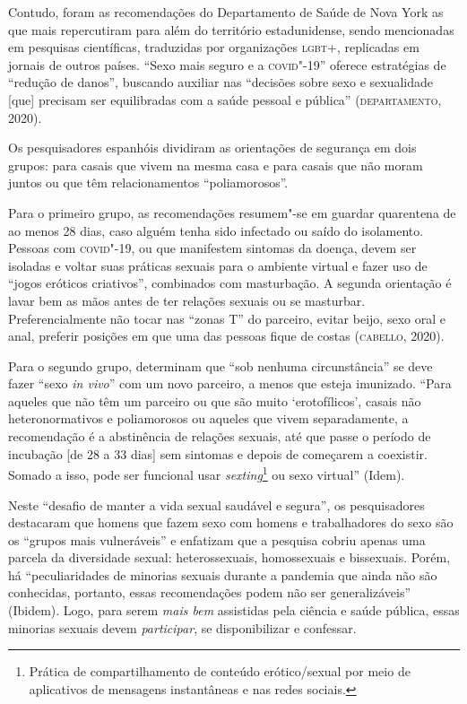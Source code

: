 Contudo, foram as recomendações do Departamento de Saúde de Nova York as
que mais repercutiram para além do território estadunidense, sendo
mencionadas em pesquisas científicas, traduzidas por organizações \textsc{lgbt}+,
replicadas em jornais de outros países. ``Sexo mais seguro e a
\textsc{covid}"-19'' oferece estratégias de ``redução de danos'', buscando
auxiliar nas ``decisões sobre sexo e sexualidade {[}que{]} precisam ser
equilibradas com a saúde pessoal e pública'' (\textsc{departamento}, 2020).

Os pesquisadores espanhóis dividiram as orientações de segurança em dois
grupos: para casais que vivem na mesma casa e para casais que não moram
juntos ou que têm relacionamentos ``poliamorosos''.

Para o primeiro grupo, as recomendações resumem"-se em guardar quarentena
de ao menos 28 dias, caso alguém tenha sido infectado ou saído do
isolamento. Pessoas com \textsc{covid}"-19, ou que manifestem sintomas da doença,
devem ser isoladas e voltar suas práticas sexuais para o ambiente
virtual e fazer uso de ``jogos eróticos criativos'', combinados com
masturbação. A segunda orientação é lavar bem as mãos antes de ter
relações sexuais ou se masturbar. Preferencialmente não tocar nas
``zonas T'' do parceiro, evitar beijo, sexo oral e anal, preferir
posições em que uma das pessoas fique de costas (\textsc{cabello}, 2020).

Para o segundo grupo, determinam que ``sob nenhuma circunstância'' se
deve fazer ``sexo \emph{in vivo}'' com um novo parceiro, a menos que
esteja imunizado. ``Para aqueles que não têm um parceiro ou que são
muito `erotofílicos', casais não heteronormativos e poliamorosos ou
aqueles que vivem separadamente, a recomendação é a abstinência de
relações sexuais, até que passe o período de incubação {[}de 28 a 33
dias{]} sem sintomas e depois de começarem a coexistir. Somado a isso,
pode ser funcional usar \emph{sexting}\footnote{Prática de
  compartilhamento de conteúdo erótico/sexual por meio de aplicativos de
  mensagens instantâneas e nas redes sociais.} ou sexo virtual'' (Idem).

Neste ``desafio de manter a vida sexual saudável e segura'', os
pesquisadores destacaram que homens que fazem sexo com homens e
trabalhadores do sexo são os ``grupos mais vulneráveis'' e enfatizam que
a pesquisa cobriu apenas uma parcela da diversidade sexual:
heterossexuais, homossexuais e bissexuais. Porém, há ``peculiaridades de
minorias sexuais durante a pandemia que ainda não são conhecidas,
portanto, essas recomendações podem não ser generalizáveis'' (Ibidem).
Logo, para serem \emph{mais bem} assistidas pela ciência e saúde
pública, essas minorias sexuais devem \emph{participar}, se
disponibilizar e confessar.

